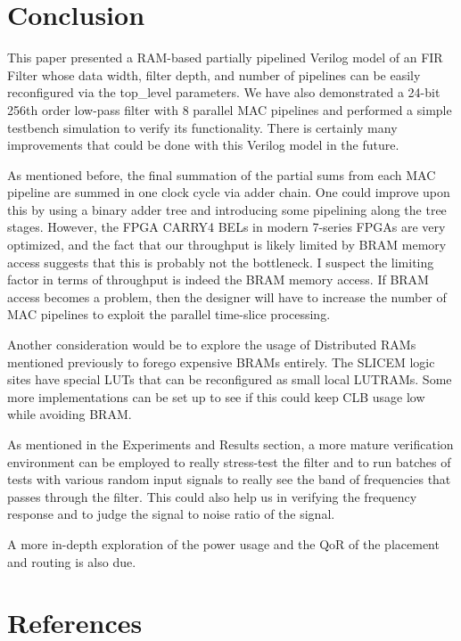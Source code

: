 \documentclass{article}
\begin{document}
\section{Conclusion}
    This paper presented a RAM-based partially pipelined Verilog model of an FIR Filter whose data width, filter depth, and number of pipelines
    can be easily reconfigured via the top\_level parameters.
    We have also demonstrated a 24-bit 256th order low-pass filter with 8 parallel MAC pipelines and performed a simple testbench simulation to verify its functionality.
    There is certainly many improvements that could be done with this Verilog model in the future.

    As mentioned before, the final summation of the partial sums from each MAC pipeline are summed in one clock cycle via adder chain.
    One could improve upon this by using a binary adder tree and introducing some pipelining along the tree stages.
    However, the FPGA CARRY4 BELs in modern 7-series FPGAs are very optimized, and the fact that our throughput is likely
    limited by BRAM memory access suggests that this is probably not the bottleneck.
    I suspect the limiting factor in terms of throughput is indeed the BRAM memory access.
    If BRAM access becomes a problem, then the designer will have to increase the number of MAC pipelines to exploit the parallel time-slice processing.

    Another consideration would be to explore the usage of Distributed RAMs mentioned previously to forego expensive BRAMs entirely.
    The SLICEM logic sites have special LUTs that can be reconfigured as small local LUTRAMs.
    Some more implementations can be set up to see if this could keep CLB usage low while avoiding BRAM.

    As mentioned in the Experiments and Results section, a more mature verification environment can be employed to really stress-test the filter
    and to run batches of tests with various random input signals to really see the band of frequencies that passes through the filter.
    This could also help us in verifying the frequency response and to judge the signal to noise ratio of the signal.

    A more in-depth exploration of the power usage and the QoR of the placement and routing is also due.


\newpage
\section{References}
    
    \nocite{*}
    
\end{document}
